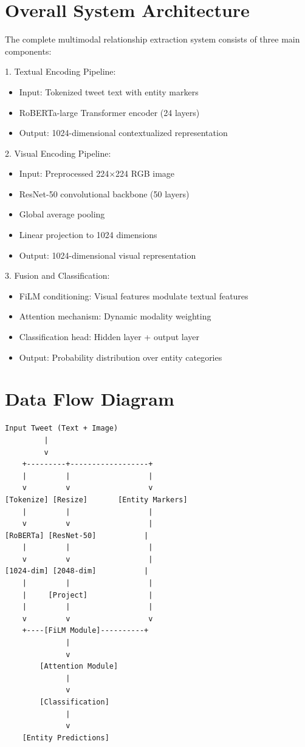 \documentclass[12pt,a4paper]{report}
\begin{document}
\section{Overall System Architecture}

The complete multimodal relationship extraction system consists of three main components:

1. Textual Encoding Pipeline:
   \begin{itemize}
   \item Input: Tokenized tweet text with entity markers
   \item RoBERTa-large Transformer encoder (24 layers)
   \item Output: 1024-dimensional contextualized representation
   \end{itemize}

2. Visual Encoding Pipeline:
   \begin{itemize}
   \item Input: Preprocessed 224×224 RGB image
   \item ResNet-50 convolutional backbone (50 layers)
   \item Global average pooling
   \item Linear projection to 1024 dimensions
   \item Output: 1024-dimensional visual representation
   \end{itemize}

3. Fusion and Classification:
   \begin{itemize}
   \item FiLM conditioning: Visual features modulate textual features
   \item Attention mechanism: Dynamic modality weighting
   \item Classification head: Hidden layer + output layer
   \item Output: Probability distribution over entity categories
   \end{itemize}

\section{Data Flow Diagram}

\begin{verbatim}
Input Tweet (Text + Image)
         |
         v
    +---------+------------------+
    |         |                  |
    v         v                  v
[Tokenize] [Resize]       [Entity Markers]
    |         |                  |
    v         v                  |
[RoBERTa] [ResNet-50]           |
    |         |                  |
    v         v                  |
[1024-dim] [2048-dim]           |
    |         |                  |
    |     [Project]              |
    |         |                  |
    v         v                  v
    +----[FiLM Module]----------+
              |
              v
        [Attention Module]
              |
              v
        [Classification]
              |
              v
    [Entity Predictions]
\end{verbatim}
\end{document}
